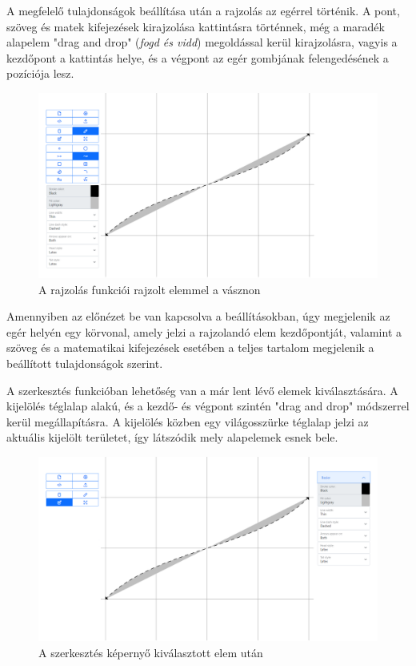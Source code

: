 A megfelelő tulajdonságok beállítása után a rajzolás az egérrel történik. A pont, szöveg és matek kifejezések kirajzolása kattintásra történnek, még a maradék alapelem "drag and drop" (\textit{fogd és vidd}) megoldással kerül kirajzolásra, vagyis a kezdőpont a kattintás helye, és a végpont az egér gombjának felengedésének a pozíciója lesz.

\begin{figure}[!h]
	\label{fig:draw}
	\centering
	\includegraphics[width=\textwidth]{images/editor_draw.png}
	\caption{A rajzolás funkciói rajzolt elemmel a vásznon}
\end{figure}

Amennyiben az előnézet be van kapcsolva a beállításokban, úgy megjelenik az egér helyén egy körvonal, amely jelzi a rajzolandó elem kezdőpontját, valamint a szöveg és a matematikai kifejezések esetében a teljes tartalom megjelenik a beállított tulajdonságok szerint.



A szerkesztés funkcióban lehetőség van a már lent lévő elemek kiválasztására. A kijelölés téglalap alakú, és a kezdő- és végpont szintén "drag and drop" módszerrel kerül megállapításra. A kijelölés közben egy világosszürke téglalap jelzi az aktuális kijelölt területet, így látszódik mely alapelemek esnek bele.

\begin{figure}[!h]
	\label{fig:edit}
	\centering
	\includegraphics[width=\textwidth]{images/editor_edit.png}
	\caption{A szerkesztés képernyő kiválasztott elem után}
\end{figure}

